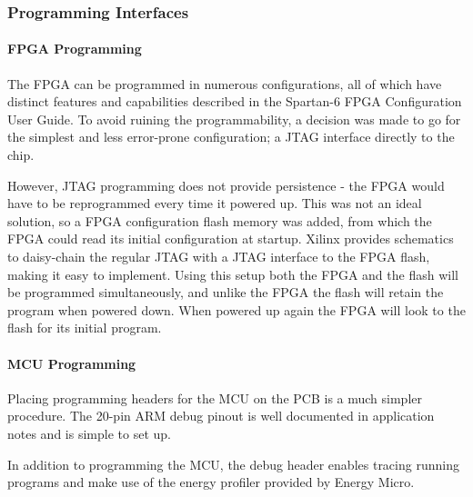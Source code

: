
\subsubsection{Programming Interfaces}

\paragraph{FPGA Programming}
The FPGA can be programmed in numerous configurations, all of which have
distinct features and capabilities described in the 
Spartan-6 FPGA Configuration User Guide. To avoid ruining the programmability, a
decision was made to go for the simplest and less error-prone configuration; a
JTAG interface directly to the chip.

However, JTAG programming does not provide persistence - the FPGA would have to
be reprogrammed every time it powered up. This was not an ideal solution, so a
FPGA configuration flash memory was added, from which the FPGA could read its
initial configuration at startup. Xilinx provides schematics to daisy-chain the
regular JTAG with a JTAG interface to the FPGA flash, making it easy to
implement. Using this setup both the FPGA and the flash will be programmed
simultaneously, and unlike the FPGA the flash will retain the program when
powered down. When powered up again the FPGA will look to the flash for its
initial program.

\paragraph{MCU Programming}
Placing programming headers for the MCU on the PCB is a much simpler procedure.
The 20-pin ARM debug pinout is well documented in application notes and is
simple to set up.

In addition to programming the MCU, the debug header enables tracing running
programs and make use of the energy profiler provided by Energy Micro.

